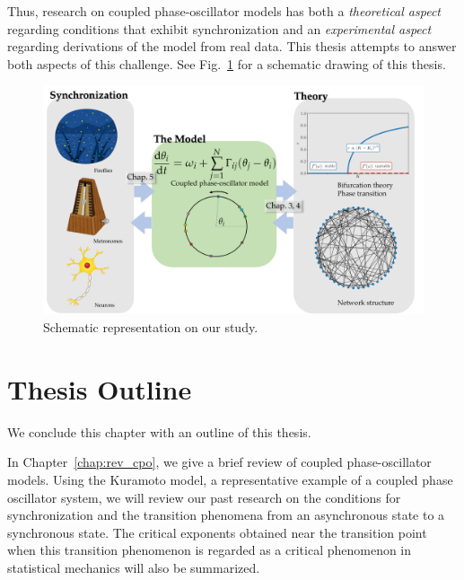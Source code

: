 Thus, research on coupled phase-oscillator models has both a \textit{theoretical aspect} regarding conditions that exhibit synchronization and an \textit{experimental aspect} regarding derivations of the model from real data.
This thesis attempts to answer both aspects of this challenge.
See Fig.~\ref{fig:ponchi} for a schematic drawing of this thesis.

\begin{figure}[htbp]
  \centering
  \includegraphics[width=\textwidth]{figs/phd_schematic.pdf}
  \caption{Schematic representation on our study.}
  \label{fig:ponchi}
\end{figure}

\section{Thesis Outline}

We conclude this chapter with an outline of this thesis.

In Chapter~\ref{chap:rev_cpo}, we give a brief review of coupled phase-oscillator models.
Using the Kuramoto model, a representative example of a coupled phase oscillator system, we will review our past research on the conditions for synchronization and the transition phenomena from an asynchronous state to a synchronous state. The critical exponents obtained near the transition point when this transition phenomenon is regarded as a critical phenomenon in statistical mechanics will also be summarized.

